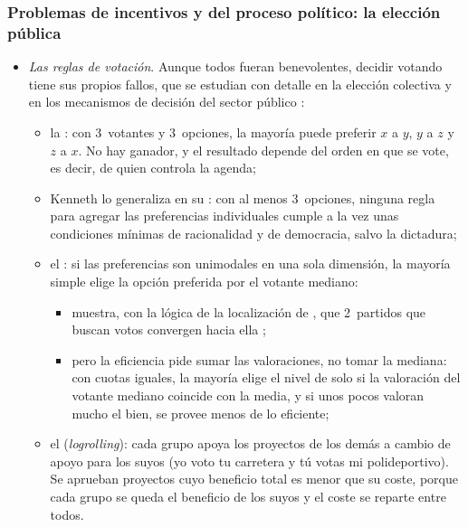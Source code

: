 \documentclass[11pt]{article}
\begin{document}
\subsubsection{Problemas de incentivos y del proceso político: la elección pública}\label{sec:problemas-incentivos}

\begin{itemize}
\item \emph{Las reglas de votación}. Aunque todos fueran benevolentes, decidir votando tiene sus propios fallos, que se estudian con detalle en la elección colectiva  y en los mecanismos de decisión del sector público :
  \begin{itemize}
  \item la \nocite{Condorcet1785Essai}: con 3~votantes y 3~opciones, la mayoría puede preferir $x$ a $y$, $y$ a $z$ y $z$ a $x$. No hay ganador, y el resultado depende del orden en que se vote, es decir, de quien controla la agenda;
  \item Kenneth \textcite{Arrow1951Social} lo generaliza en su : con al menos 3~opciones, ninguna regla para agregar las preferencias individuales cumple a la vez unas condiciones mínimas de racionalidad y de democracia, salvo la dictadura;
  \item el \nocite{Black1948Rationale}: si las preferencias son unimodales en una sola dimensión, la mayoría simple elige la opción preferida por el votante mediano:
    \begin{itemize}
    \item \textcite{Downs1957Economic} muestra, con la lógica de la localización de , que 2~partidos que buscan votos convergen hacia ella ;
    \item pero la eficiencia pide sumar las valoraciones, no tomar la mediana: con cuotas iguales, la mayoría elige el nivel de  solo si la valoración del votante mediano coincide con la media, y si unos pocos valoran mucho el bien, se provee menos de lo eficiente\nocite{Bowen1943Interpretation};
    \end{itemize}
  \item el  (\emph{logrolling})\nocite{Tullock1959Problems}: cada grupo apoya los proyectos de los demás a cambio de apoyo para los suyos (yo voto tu carretera y tú votas mi polideportivo). Se aprueban proyectos cuyo beneficio total es menor que su coste, porque cada grupo se queda el beneficio de los suyos y el coste se reparte entre todos.

\end{itemize}
\end{itemize}
\end{document}
